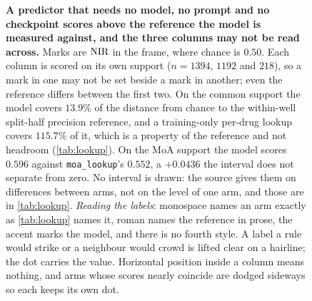 \begin{figure}[htbp]
\centering

\caption[The baseline ladder]{\textbf{A predictor that needs no model, no prompt
and no checkpoint scores above the reference the model is measured against, and
the three columns may not be read across.} Marks are $\textrm{NIR}$ in the \Rframe{}
frame, where chance is $0.50$. Each column is scored on its own support
($n = \num{1394}$, $\num{1192}$ and $\num{218}$), so a mark in one may not be set
beside a mark in another; even the reference differs between the first two. On
the common support the model covers $13.9\%$ of the distance from chance to the
within-well split-half precision reference, and a training-only per-drug lookup
covers $115.7\%$ of it, which is a property of the reference and not headroom
(\cref{tab:lookup}). On the MoA support the model scores $0.596$ against
\texttt{moa\_lookup}'s $0.552$, a $+0.0436$ the interval does not separate from
zero. No interval is drawn: the source gives them on differences between arms,
not on the level of one arm, and those are in \cref{tab:lookup}. \emph{Reading
the labels}: monospace names an arm exactly as \cref{tab:lookup} names it, roman
names the reference in prose, the accent marks the model, and there is no fourth
style. A label a rule would strike or a neighbour would crowd is lifted clear on
a hairline; the dot carries the value. Horizontal position inside a column means
nothing, and arms whose scores nearly coincide are dodged sideways so each keeps
its own dot.}
\label{fig:ladder}
\end{figure}

